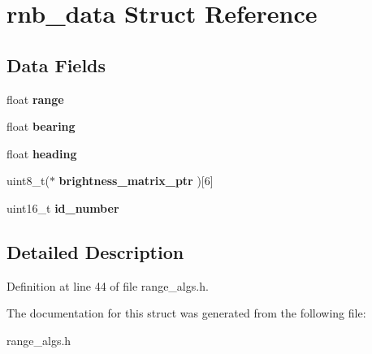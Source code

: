 \hypertarget{structrnb__data}{\section{rnb\+\_\+data Struct Reference}
\label{structrnb__data}
}
\subsection*{Data Fields}
\begin{DoxyCompactItemize}
\item 
\hypertarget{structrnb__data_a5029d37f21cfc96bb6f346e33a55c55a}{float {\bfseries range}}\label{structrnb__data_a5029d37f21cfc96bb6f346e33a55c55a}

\item 
\hypertarget{structrnb__data_a3d243933b8fc987c3af9ae90648541b7}{float {\bfseries bearing}}\label{structrnb__data_a3d243933b8fc987c3af9ae90648541b7}

\item 
\hypertarget{structrnb__data_adee064838f37640408fbf96b4fcc2294}{float {\bfseries heading}}\label{structrnb__data_adee064838f37640408fbf96b4fcc2294}

\item 
\hypertarget{structrnb__data_a11999683fec83d7005b480ab36e992a1}{uint8\+\_\+t($\ast$ {\bfseries brightness\+\_\+matrix\+\_\+ptr} )\mbox{[}6\mbox{]}}\label{structrnb__data_a11999683fec83d7005b480ab36e992a1}

\item 
\hypertarget{structrnb__data_a8faf503f816dc7b99e15c18ae64453ce}{uint16\+\_\+t {\bfseries id\+\_\+number}}\label{structrnb__data_a8faf503f816dc7b99e15c18ae64453ce}

\end{DoxyCompactItemize}


\subsection{Detailed Description}


Definition at line 44 of file range\+\_\+algs.\+h.



The documentation for this struct was generated from the following file\+:\begin{DoxyCompactItemize}
\item 
range\+\_\+algs.\+h\end{DoxyCompactItemize}
